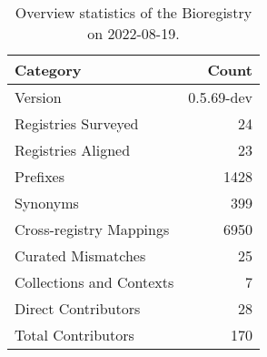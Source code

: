 \begin{table}
\centering
\caption{Overview statistics of the Bioregistry on 2022-08-19.}
\label{tab:bioregistry-summary}
\begin{tabular}{lr}
\toprule
                Category &      Count \\
\midrule
                 Version & 0.5.69-dev \\
     Registries Surveyed &         24 \\
      Registries Aligned &         23 \\
                Prefixes &       1428 \\
                Synonyms &        399 \\
 Cross-registry Mappings &       6950 \\
      Curated Mismatches &         25 \\
Collections and Contexts &          7 \\
     Direct Contributors &         28 \\
      Total Contributors &        170 \\
\bottomrule
\end{tabular}
\end{table}
